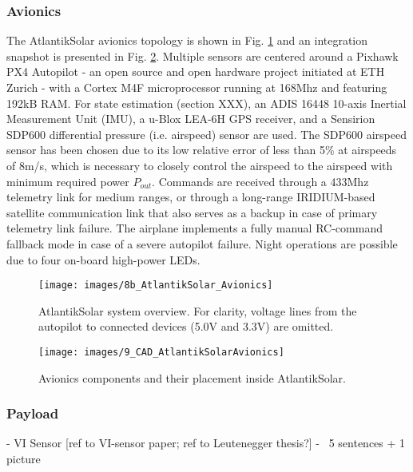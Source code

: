 \subsubsection{Avionics}

The AtlantikSolar avionics topology is shown in Fig. \ref{fig:AtlantikSolar_SystemOverview} and an integration snapshot is presented in Fig. \ref{fig:9_CAD_AtlantikSolarAvionics}. Multiple sensors are centered around a Pixhawk PX4 Autopilot - an open source and open hardware project initiated at ETH Zurich - with a Cortex M4F microprocessor running at 168Mhz and featuring 192kB RAM. For state estimation (section XXX), an ADIS 16448 10-axis Inertial Measurement Unit (IMU), a u-Blox LEA-6H GPS receiver, and a Sensirion SDP600 differential pressure (i.e. airspeed) sensor are used. The SDP600 airspeed sensor has been chosen due to its low relative error of less than 5\% at airspeeds of 8m/s, which is necessary to closely control the airspeed to the airspeed with minimum required power $P_{out}$. Commands are received through a 433Mhz telemetry link for medium ranges, or through a long-range IRIDIUM-based satellite communication link that also serves as a backup in case of primary telemetry link failure. The airplane implements a fully manual RC-command fallback mode in case of a severe autopilot failure. Night operations are possible due to four on-board high-power LEDs.

\begin{figure}[tb]
    \centering
     \texttt{[image: images/8b\_AtlantikSolar\_Avionics]}
    \caption{AtlantikSolar system overview. For clarity, voltage lines from the autopilot to connected devices (5.0V and 3.3V) are omitted.}
    \label{fig:AtlantikSolar_SystemOverview}
\end{figure}

\begin{figure}[tb]
    \centering
    \texttt{[image: images/9\_CAD\_AtlantikSolarAvionics]}
    \caption{Avionics components and their placement inside AtlantikSolar.}
    \label{fig:9_CAD_AtlantikSolarAvionics}
\end{figure}

\subsubsection{Payload}
  - VI Sensor [ref to VI-sensor paper; ref to Leutenegger thesis?]
  - ~5 sentences + 1 picture
  
